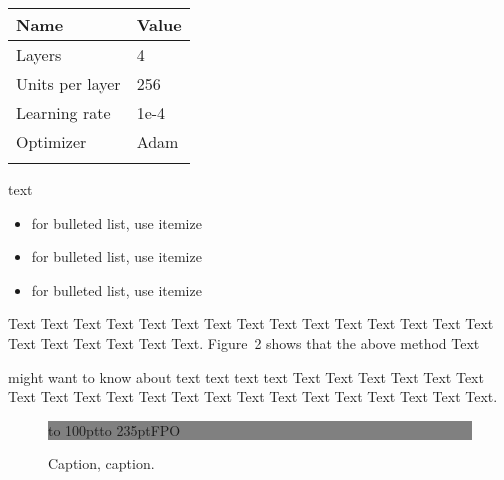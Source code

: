 \documentclass{bioinfo}
\begin{document}
\begin{methods}
\begin{table}[!t]
 {
\begin{tabular}{@{}ll@{}}
\toprule Name & Value \\
\midrule
Layers & 4\\
Units per layer & 256\\
Learning rate & 1e-4\\
Optimizer & Adam\\
\botrule
\end{tabular}}{}
\end{table}

text\vspace*{1pt}

\begin{itemize}
\item for bulleted list, use itemize
\item for bulleted list, use itemize
\item for bulleted list, use itemize\vspace*{1pt}
\end{itemize}

Text Text Text Text Text Text  Text Text Text Text Text Text Text
Text Text  Text Text Text Text Text Text.
Figure~2\vphantom{\ref{fig:02}} shows that the above method  Text

\citealp{Boffelli03} might want to know about  text text text text
Text Text Text Text Text Text  Text Text Text Text Text Text Text
Text Text  Text Text Text Text Text Text.

\end{methods}

\begin{figure}[!tpb]%
\fboxsep=0pt\colorbox{gray}{\begin{minipage}[t]{235pt} \vbox to 100pt{\vfill\hbox to
235pt{\hfill\fontsize{24pt}{24pt}\selectfont FPO\hfill}\vfill}
\end{minipage}}
\caption{Caption, caption.}\label{fig:01}
\end{figure}

\end{document}
